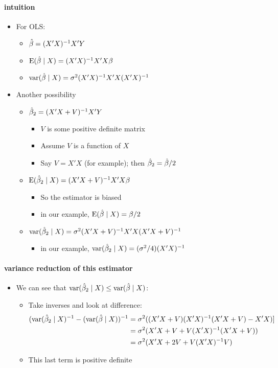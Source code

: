 \paragraph{intuition}
\begin{itemize}
\item For OLS:
\begin{itemize}
\item $\hat{\beta} = (X'X)^{-1}X'Y$
\item $\operatorname{E}(\hat{\beta} \mid X) = (X'X)^{-1}X'X\beta$
\item $\operatorname{var}(\hat{\beta} \mid X) = \sigma^2(X'X)^{-1} X'X (X'X)^{-1}$
\end{itemize}
\item Another possibility
\begin{itemize}
\item $\hat{\beta}_2 = (X'X + V)^{-1}X'Y$
\begin{itemize}
\item $V$ is some positive definite matrix
\item Assume $V$ is a function of $X$
\item Say $V = X'X$ (for example); then $\hat{\beta}_2 = \hat{\beta} / 2$
\end{itemize}
\item $\operatorname{E}(\hat{\beta}_2 \mid X) = (X'X + V)^{-1}X'X\beta$
\begin{itemize}
\item So the estimator is biased
\item in our example, $\operatorname{E}(\hat{\beta} \mid X) = \beta/2$
\end{itemize}
\item $\operatorname{var}(\hat{\beta}_2 \mid X) = \sigma^2 (X'X + V)^{-1} X'X (X'X + V)^{-1}$
\begin{itemize}
\item in our example, $\operatorname{var}(\hat{\beta}_2 \mid X) = (\sigma^2/4) (X'X)^{-1}$
\end{itemize}
\end{itemize}
\end{itemize}

\paragraph{variance reduction of this estimator}
\begin{itemize}
\item We can see that $\operatorname{var}(\hat{\beta}_2 \mid X) \leq \operatorname{var}(\hat{\beta} \mid X)$:
\begin{itemize}
\item Take inverses and look at difference:
  \begin{align*}
    (\operatorname{var}(\hat{\beta}_2 \mid X)^{-1} - (\operatorname{var}(\hat{\beta} \mid X))^{-1}
    &= \sigma^2((X'X + V) (X'X)^{-1} (X'X + V) - X'X) ] \\
    &= \sigma^2 (X'X + V + V(X'X)^{-1} (X'X + V)) \\
    &= \sigma^2 (X'X + 2 V + V(X'X)^{-1}V) 
  \end{align*}
\item This last term is positive definite
\end{itemize}
\end{itemize}

